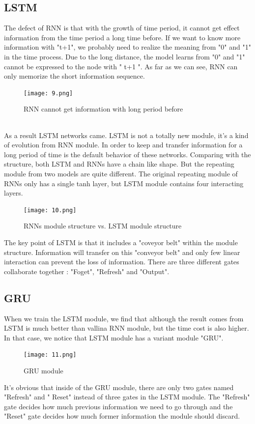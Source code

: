 \documentclass{article}
\begin{document}
\subsection{LSTM}
\noindent The defect of RNN is that with the growth of time period, it cannot get effect information from the time period a long time before. If we want to know more information with "t+1", we probably need to realize the meaning from "0" and "1" in the time process. Due to the long distance, the model learns from "0" and "1" cannot be expressed to the node with " t+1 ". As far as we can see, RNN can only memorize the short information sequence.
\begin{figure}[h]
	\centering
	\texttt{[image: 9.png]}
	\caption{RNN cannot get information with long period before}
\end{figure}\\
\noindent As a result LSTM networks came. LSTM is not a totally new module, it's a kind of evolution from RNN module. In order to keep and transfer information for a long period of time is the default behavior of these networks. Comparing with the structure, both LSTM and RNNs have a chain like shape. But the repeating module from two models are quite different. The original repeating module of RNNs only has a single tanh layer, but LSTM module contains four interacting layers.
\begin{figure}[H]
	\centering
	\texttt{[image: 10.png]}
	\caption{RNNs module structure vs. LSTM module structure}
\end{figure}
\noindent The key point of LSTM is that it includes a "coveyor belt" within the module structure. Information will transfer on this "conveyor belt" and only few linear interaction can prevent the loss of information. There are three different gates collaborate together : "Foget", "Refresh" and "Output". \\
\subsection{GRU}
\noindent When we train the LSTM module, we find that although the result comes from LSTM is much better than vallina RNN module, but the time cost is also higher. In that case, we notice that LSTM module has a variant module "GRU".
\begin{figure}[H]
	\centering
	\texttt{[image: 11.png]}
	\caption{GRU module}
\end{figure}
\noindent It's obvious that inside of the GRU module, there are only two gates named "Refresh" and " Reset" instead of three gates in the LSTM module. The "Refresh" gate decides how much previous information we need to go through and the "Reset" gate decides how much former information the module should discard.\\
\end{document}
